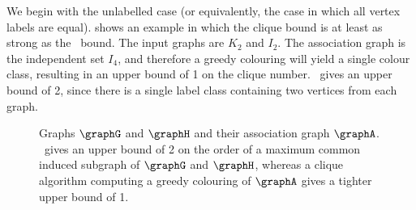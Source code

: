 We begin with the unlabelled case (or equivalently, the case in which
all vertex labels are equal).   shows
an example in which the clique bound is at least as strong as the \McSplit\ bound.
The input graphs are $K_2$ and $I_2$.  The association graph
is the independent set $I_4$, and therefore a greedy colouring will yield
a single colour class, resulting in an upper bound of 1 on the clique
number.  \McSplit\ gives an upper bound of 2, since there is a single label
class containing two vertices from each graph.

\begin{figure}[htb]
\centering
{}
\qquad\quad
{}
\qquad\quad
{}
\qquad

\caption{Graphs $\graphG$ and $\graphH$ and their association graph $\graphA$.  \McSplit\
    gives an upper bound of 2 on the order of a maximum common induced subgraph
    of $\graphG$ and $\graphH$, whereas a clique algorithm computing
    a greedy colouring of $\graphA$ gives a tighter upper bound of 1.}
\label{fig:clique-better-bound}
\end{figure}

